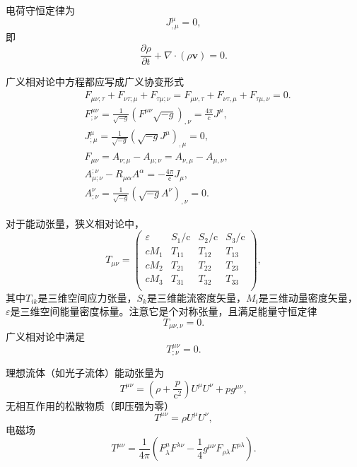 \documentclass[11pt, a4paper, oneside, onecolumn]{ctexart}
\numberwithin{equation}{subsection}
\begin{document}
电荷守恒定律为
\begin{equation}
J^{\mu}_{,\mu}=0,
\end{equation}
即
\begin{equation}
\frac{\partial{}\rho}{\partial{}t}+\nabla\cdot\left(\rho\boldsymbol{v}\right)=0.
\end{equation}

广义相对论中方程都应写成广义协变形式
\begin{align}
&F_{\mu\nu;\tau}+F_{\nu\tau;\mu}+F_{\tau\mu;\nu}=F_{\mu\nu,\tau}+F_{\nu\tau,\mu}+F_{\tau\mu,\nu}=0.\\
&F^{\mu\nu}_{;\nu}=\frac{1}{\sqrt{-g}}\left(F^{\mu\nu}\sqrt{-g}\right)_{,\nu}=\frac{4\pi}{\mathrm{c}}J^{\mu},\\
&J^{\mu}_{;\mu}=\frac{1}{\sqrt{-g}}\left(\sqrt{-g}J^{\mu}\right)_{,\mu}=0,\\
&F_{\mu\nu}=A_{\nu;\mu}-A_{\mu;\nu}=A_{\nu,\mu}-A_{\mu,\nu},\\
&A_{\mu;\nu}^{;\nu}-R_{\mu\alpha}A^{\alpha}=-\frac{4\pi}{\mathrm{c}}J_{\mu},\\
&A^{\nu}_{;\nu}=\frac{1}{\sqrt{-g}}\left(\sqrt{-g}A^{\nu}\right)_{,\nu}=0.
\end{align}

对于能动张量，狭义相对论中，
\begin{equation}
T_{\mu\nu}=\begin{pmatrix}
\varepsilon & S_{1}/\mathrm{c} & S_{2}/\mathrm{c} & S_{3}/\mathrm{c}\\
cM_{1} & T_{11} & T_{12} & T_{13}\\
cM_{2} & T_{21} & T_{22} & T_{23}\\
cM_{3} & T_{31} & T_{32} & T_{33}\\
\end{pmatrix},
\end{equation}
其中$T_{ik}$是三维空间应力张量，$S_{k}$是三维能流密度矢量，$M_{i}$是三维动量密度矢量，$\varepsilon$是三维空间能量密度标量。注意它是个对称张量，且满足能量守恒定律
\begin{equation}
T_{\mu\nu,\nu}=0.
\end{equation}
广义相对论中满足
\begin{equation}
T^{\mu\nu}_{;\nu}=0.
\end{equation}

理想流体（如光子流体）能动张量为
\begin{equation}
T^{\mu\nu}=\left(\rho+\frac{p}{\mathrm{c}^{2}}\right)U^{\mu}U^{\nu}+pg^{\mu\nu},
\end{equation}
无相互作用的松散物质（即压强为零）
\begin{equation}
T^{\mu\nu}=\rho U^{\mu}U^{\nu},
\end{equation}
电磁场
\begin{equation}
T^{\mu\nu}=\frac{1}{4\pi}\left(F_{\lambda}^{\mu}F^{\lambda\nu}-\frac{1}{4}g^{\mu\nu}F_{\rho\lambda}F^{\rho\lambda}\right).
\end{equation}
\end{document}
